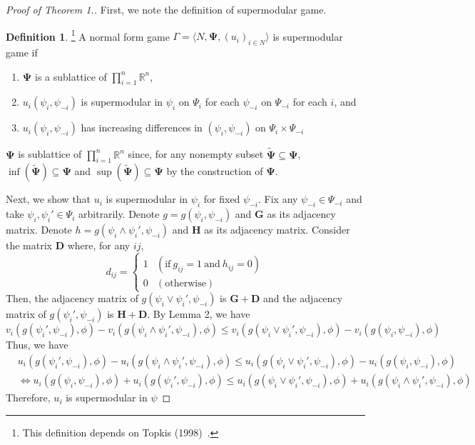 \documentclass[12pt]{article}
\theoremstyle{definition}
\newtheorem{definition}{Definition}
\newcommand{\bm}[1]{\boldsymbol{#1}}
\begin{document}
\begin{proof}[Proof of Theorem 1.]
	First, we note the definition of supermodular game.

	\begin{definition}\footnote{This definition depends on Topkis (1998)~\cite{topkis1998}.}
		A normal form game $\Gamma = \langle N, \bm{\Psi}, {(u_i)}_{i \in N} \rangle$ is supermodular game if
		\begin{enumerate}
			\item $\bm{\Psi}$ is a sublattice of $\prod_{i=1}^n \mathbb{R}^n$, 
			\item $u_i(\psi_i, \psi_{-i})$ is supermodular in $\psi_i$ on $\Psi_i$ for each $\psi_{-i}$ on $\Psi_{-i}$ for each $i$, and
			\item $u_i(\psi_i, \psi_{-i})$ has increasing differences in $(\psi_i, \psi_{-i})$ on $\Psi_i \times \Psi_{-i}$
		\end{enumerate}
	\end{definition}

	$\bm{\Psi}$ is sublattice of $\prod_{i=1}^n \mathbb{R}^n$ since, for any nonempty subset $\bm{\tilde{\Psi}} \subseteq \bm{\Psi}$, $\inf(\bm{\tilde{\Psi}}) \subseteq \bm{\Psi}$ and $\sup(\bm{\tilde{\Psi}}) \subseteq \bm{\Psi}$ by the construction of $\bm{\Psi}$.

	Next, we show that $u_i$ is supermodular in $\psi_i$ for fixed $\psi_{-i}$.
	Fix any $\psi_{-i} \in \Psi_{-i}$ and take $\psi_i, \psi_i' \in \Psi_i$ arbitrarily.
	Denote $g = g(\psi_i, \psi_{-i})$ and $\bm{G}$ as its adjacency matrix.
	Denote $h = g(\psi_i \wedge \psi_i', \psi_{-i})$ and $\bm{H}$ as its adjacency matrix.
	Consider the matrix $\bm{D}$ where, for any $ij$,
	\[ d_{ij} = \begin{cases}
					1 & (\text{if} \ g_{ij} = 1 \ \text{and} \ h_{ij} = 0) \\
					0 & (\text{otherwise})
				\end{cases} \]
	Then, the adjacency matrix of $g(\psi_i \vee \psi_i', \psi_{-i})$ is $\bm{G} + \bm{D}$ and the adjacency matrix of $g(\psi_i', \psi_{-i})$ is $\bm{H} + \bm{D}$.
	By Lemma 2, we have
	\[ v_i(g(\psi_i', \psi_{-i}), \phi) - v_i(g(\psi_i \wedge \psi_i', \psi_{-i}), \phi) \le v_i(g(\psi_i \vee \psi_i', \psi_{-i}), \phi) - v_i(g(\psi_i, \psi_{-i}), \phi) \]
	Thus, we have
	\begin{align*}
	& u_i(g(\psi_i', \psi_{-i}), \phi) - u_i(g(\psi_i \wedge \psi_i', \psi_{-i}), \phi) \le u_i(g(\psi_i \vee \psi_i', \psi_{-i}), \phi) - u_i(g(\psi_i, \psi_{-i}), \phi) \\
		& \Leftrightarrow u_i(g(\psi_i, \psi_{-i}), \phi) + u_i(g(\psi_i', \psi_{-i}), \phi) \le u_i(g(\psi_i \vee \psi_i', \psi_{-i}), \phi) + u_i(g(\psi_i \wedge \psi_i', \psi_{-i}), \phi) 
	\end{align*}
	Therefore, $u_i$ is supermodular in $\psi$


\end{proof}
\end{document}
